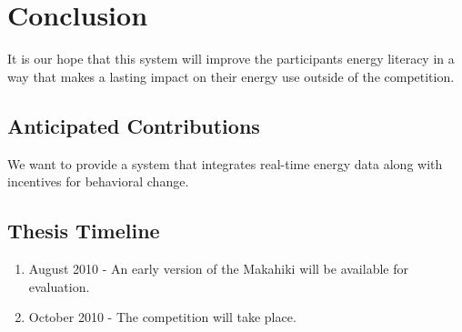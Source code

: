 \chapter{Conclusion}
\label{conclusion}

It is our hope that this system will improve the participants energy literacy in a way that makes a lasting impact on their energy use outside of the competition.

\section{Anticipated Contributions}

We want to provide a system that integrates real-time energy data along with incentives for behavioral change.

\section{Thesis Timeline}

\begin{enumerate}
\item August 2010 - An early version of the Makahiki will be available for evaluation.
\item October 2010 - The competition will take place.
\end{enumerate}